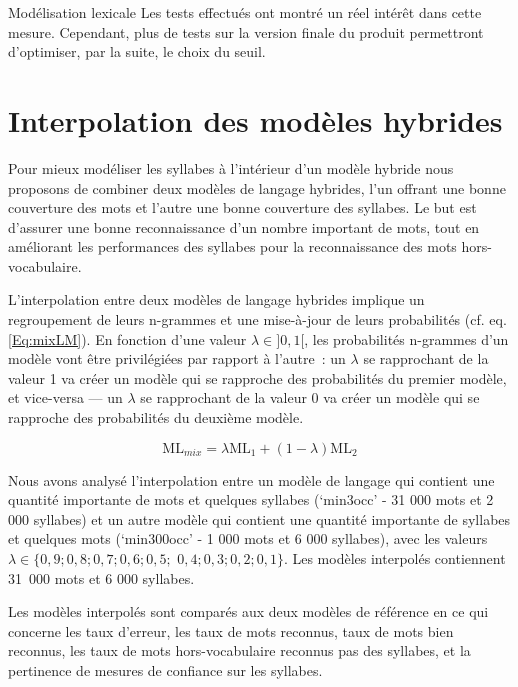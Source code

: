 \documentclass{style/these}
\begin{document}
\begin{part}{Modélisation lexicale}
Les tests effectués ont montré un réel intérêt dans cette mesure. 
Cependant, plus de tests sur la version finale du produit permettront d'optimiser, par la suite, le choix du seuil. 

\section{Interpolation des modèles hybrides}
\renewcommand{\rightmark}{Interpolation des modèles hybrides}


Pour mieux modéliser les syllabes à l'intérieur d'un modèle hybride nous proposons de combiner deux modèles de langage hybrides, l'un offrant une bonne couverture des mots et l'autre une bonne couverture des syllabes. 
Le but est d'assurer une bonne reconnaissance d'un nombre important de mots, tout en améliorant les performances des syllabes pour la reconnaissance des mots hors-vocabulaire. 

L'interpolation entre deux modèles de langage hybrides implique un regroupement de leurs n-grammes et une mise-à-jour de leurs probabilités (cf. eq. \ref{Eq:mixLM}). 
En fonction d'une valeur $\lambda \in ]0,1[$, les probabilités n-grammes d'un modèle vont être privilégiées par rapport à l'autre~: un $\lambda$ se rapprochant de la valeur 1 va créer un modèle qui se rapproche des probabilités du premier modèle, et vice-versa — un $\lambda$ se rapprochant de la valeur 0 va créer un modèle qui se rapproche des probabilités du deuxième modèle.

\begin{equation}
\text{ML}_{mix} = \lambda \text{ML}_1 + (1-\lambda) \text{ML}_2
\label{Eq:mixLM}
\end{equation}

Nous avons analysé l'interpolation entre un modèle de langage qui contient une quantité importante de mots et quelques syllabes (`min3occ' - 31 000 mots et 2 000 syllabes) et un autre modèle qui contient une quantité importante de syllabes et quelques mots (`min300occ' - 1 000 mots et 6 000 syllabes), avec les valeurs $\lambda \in \{0,9; 0,8; 0,7; 0,6; 0,5;$ $0,4; 0,3; 0,2; 0,1\}$. Les modèles interpolés contiennent 31~000 mots et 6 000 syllabes.  

Les modèles interpolés sont comparés aux deux modèles de référence en ce qui \linebreak concerne les taux d'erreur, les taux de mots reconnus, taux de mots bien reconnus, les taux de mots hors-vocabulaire reconnus pas des syllabes, et la pertinence de mesures de confiance sur les syllabes.


\end{part}
\end{document}

